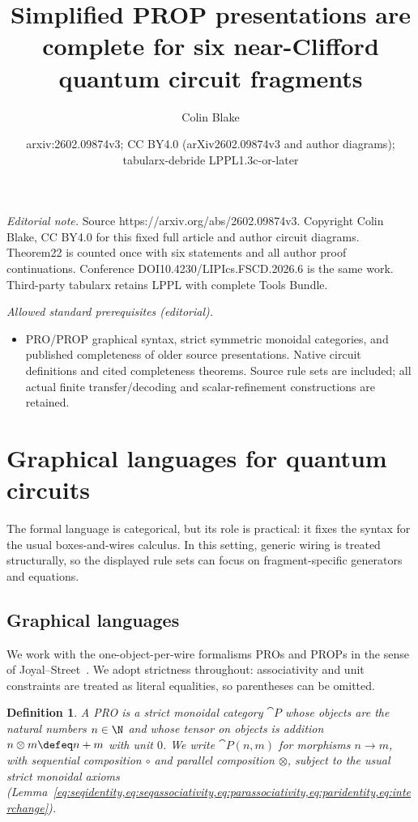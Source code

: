 \documentclass[10pt,a4paper]{article}
\title{Simplified PROP presentations are complete for six near-Clifford quantum circuit fragments}
\author{Colin Blake}
\date{arxiv:2602.09874v3; CC BY4.0 (arXiv2602.09874v3 and author diagrams); tabularx-debride LPPL1.3c-or-later}
\newtheorem{definition}[theorem]{Definition}
\def\cref#1{Lemma~\ref{#1}}%
\begin{document}
\maketitle
\setcounter{section}{1}
\noindent\textit{Editorial note.} Source https://arxiv.org/abs/2602.09874v3. Copyright Colin Blake, CC BY4.0 for this fixed full article and author circuit diagrams. Theorem22 is counted once with six statements and all author proof continuations. Conference DOI10.4230/LIPIcs.FSCD.2026.6 is the same work. Third-party tabularx retains LPPL with complete Tools Bundle.\par\medskip
\noindent\textit{Allowed standard prerequisites (editorial).}\begin{itemize}
\item PRO/PROP graphical syntax, strict symmetric monoidal categories, and published completeness of older source presentations. Native circuit definitions and cited completeness theorems. Source rule sets are included; all actual finite transfer/decoding and scalar-refinement constructions are retained.
\end{itemize}\medskip
\section{Graphical languages for quantum circuits}\label{sec:circuits}

The formal language is categorical, but its role is practical: it fixes the syntax for the usual
boxes-and-wires calculus.  In this setting, generic wiring is treated structurally, so the
displayed rule sets can focus on fragment-specific generators and equations.

\subsection{Graphical languages}

We work with the one-object-per-wire formalisms PROs and PROPs in the sense of
Joyal--Street~\cite{joyal_geometry_1991, selinger_survey_2010}.
We adopt strictness throughout: associativity
and unit constraints are treated as literal equalities, so parentheses can be omitted.

\begin{definition}
A \emph{PRO} is a strict monoidal category \(\cat{P}\) whose objects are the
natural numbers \(n\in\N\) and whose tensor on objects is addition
\(n\otimes m \defeq n+m\) with unit \(0\).  We write \(\cat{P}(n,m)\) for morphisms
\(n\to m\), with sequential composition \(\circ\) and parallel composition \(\otimes\),
subject to the usual strict monoidal axioms
(\cref{eq:seqidentity,eq:seqassociativity,eq:parassociativity,eq:paridentity,eq:interchange}).
\end{definition}
\end{document}
